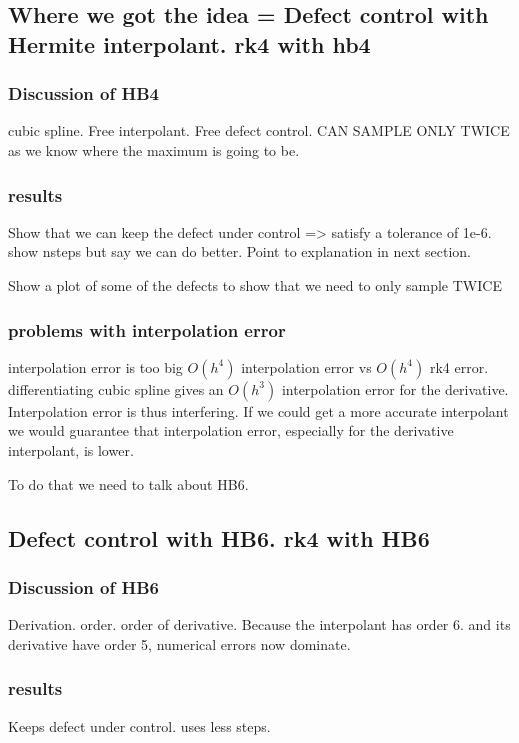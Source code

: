 \documentclass{article}
\begin{document}
\subsection{Where we got the idea = Defect control with Hermite interpolant. rk4 with hb4}
\subsubsection{Discussion of HB4}
cubic spline. Free interpolant. Free defect control. CAN SAMPLE ONLY TWICE as we know where the maximum is going to be.

\subsubsection{results}
Show that we can keep the defect under control => satisfy a tolerance of 1e-6. show nsteps but say we can do better. Point to explanation in next section.

Show a plot of some of the defects to show that we need to only sample TWICE

\subsubsection{problems with interpolation error}
interpolation error is too big $O(h^4)$ interpolation error vs $O(h^4)$ rk4 error. differentiating cubic spline gives an $O(h^3)$ interpolation error for the derivative. Interpolation error is thus interfering. If we could get a more accurate interpolant we would guarantee that interpolation error, especially for the derivative interpolant, is lower.

To do that we need to talk about HB6.

\subsection{Defect control with HB6. rk4 with HB6}
\subsubsection{Discussion of HB6}
Derivation. order. order of derivative. Because the interpolant has order 6. and its derivative have order 5, numerical errors now dominate.


\subsubsection{results}
Keeps defect under control. uses less steps.
\end{document}
